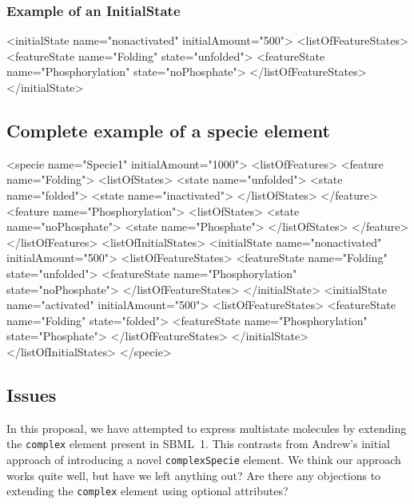 \documentclass{cekarticle}
\begin{document}
\subsubsection{Example of an InitialState}\label{sec:exampleinitialstate}

\begin{example}
<initialState name="nonactivated" initialAmount="500">
    <listOfFeatureStates>
        <featureState name="Folding" state="unfolded">
        <featureState name="Phosphorylation" state="noPhosphate">     
   </listOfFeatureStates>
</initialState>
\end{example}

\subsection{Complete example of a specie element}\label{sec:examplespecie}

\begin{example}
<specie name="Specie1" initialAmount="1000">
    <listOfFeatures>
        <feature name="Folding">
            <listOfStates>
                <state name="unfolded">
                <state name="folded">
                <state name="inactivated">
            </listOfStates>
        </feature>
        <feature name="Phosphorylation">
            <listOfStates>
                <state name="noPhosphate">
                <state name="Phosphate">
            </listOfStates>
        </feature>
    </listOfFeatures> 
    <listOfInitialStates>
        <initialState name="nonactivated" initialAmount="500">
            <listOfFeatureStates>
                <featureState name="Folding" state="unfolded">
                <featureState name="Phosphorylation" state="noPhosphate">     
            </listOfFeatureStates>
        </initialState>
        <initialState name="activated" initialAmount="500">
            <listOfFeatureStates>
                <featureState name="Folding" state="folded">
                <featureState name="Phosphorylation" state="Phosphate">       
            </listOfFeatureStates>
        </initialState>
    </listOfInitialStates>
</specie>
\end{example}

\subsection{Issues}\label{sec:issuespecie}

In this proposal, we have attempted to express multistate molecules by extending
the \texttt{complex} element present in SBML~1.  This contrasts from Andrew's
initial approach of introducing a novel \texttt{complexSpecie} element.
We think our approach works quite well, but have we left anything out?  Are
there any objections to extending the \texttt{complex} element using optional
attributes?
\end{document}
